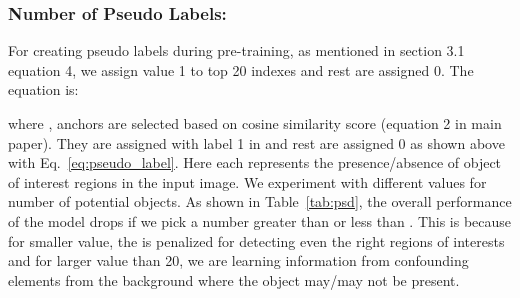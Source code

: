 \documentclass{bmvc2k}
\begin{document}
\subsubsection{Number of Pseudo Labels:} For creating pseudo labels   during pre-training, as mentioned in section 3.1 equation 4, we assign value 1 to top 20 indexes and rest are assigned 0. The equation is:



where ,  anchors are selected based on cosine similarity score  (equation 2 in main paper). They are assigned with label 1 in  and rest are assigned 0 as shown above with Eq.~\ref{eq:pseudo_label}. Here each  represents the presence/absence of object of interest regions in the input image. 
We experiment with different values for number of potential objects. As shown in Table~\ref{tab:psd}, the overall performance of the model drops if we pick a number greater than or less than . This is because for smaller value, the  is penalized for detecting even the right regions of interests and for larger value than 20, we are learning information from confounding elements from the background where the object may/may not be present.
\end{document}

